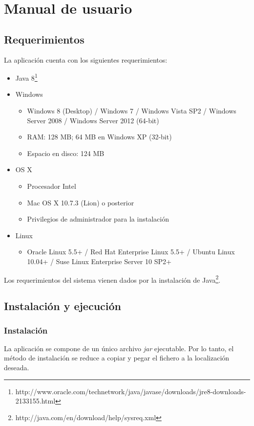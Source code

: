 
\section{Manual de usuario}

\subsection{Requerimientos}
La aplicación cuenta con los siguientes requerimientos:
\begin{itemize}
	\item Java 8\footnote{http://www.oracle.com/technetwork/java/javase/downloads/jre8-downloads-2133155.html}
	\item Windows
	\begin{itemize}
		\item Windows 8 (Desktop) / Windows 7 / Windows Vista SP2 / Windows Server 2008 / Windows Server 2012 (64-bit)
		\item RAM: 128 MB; 64 MB en Windows XP (32-bit)
		\item Espacio en disco: 124 MB
	\end{itemize}
	\item OS X
	\begin{itemize}
		\item Procesador Intel
		\item Mac OS X 10.7.3 (Lion) o posterior
		\item Privilegios de administrador para la instalación
	\end{itemize}
	\item Linux
	\begin{itemize}
		\item Oracle Linux 5.5+ / Red Hat Enterprise Linux 5.5+ / Ubuntu Linux 10.04+ / Suse Linux Enterprise Server 10 SP2+
	\end{itemize}
\end{itemize}

Los requerimientos del sistema vienen dados por la instalación de Java\footnote{http://java.com/en/download/help/sysreq.xml}.

\subsection{Instalación y ejecución}
\subsubsection{Instalación}
La aplicación se compone de un único archivo \emph{jar} ejecutable.
Por lo tanto, el método de instalación se reduce a copiar y pegar el fichero a la localización deseada.

